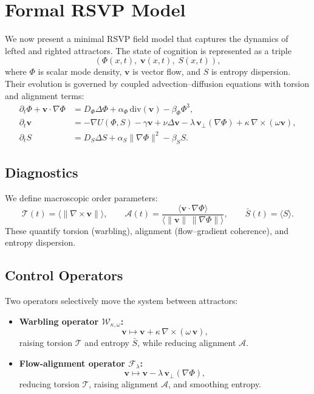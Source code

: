 \documentclass[a4paper,11pt]{article}
\begin{document}
\section{Formal RSVP Model}
\label{sec:formal-model}

We now present a minimal RSVP field model that captures the dynamics of lefted and righted attractors. The state of cognition is represented as a triple
\begin{equation}
(\Phi(x,t), \;\mathbf{v}(x,t), \;S(x,t)),
\end{equation}
where $\Phi$ is scalar mode density, $\mathbf{v}$ is vector flow, and $S$ is entropy dispersion. Their evolution is governed by coupled advection–diffusion equations with torsion and alignment terms:
\begin{align}
\partial_t \Phi + \mathbf{v}\cdot \nabla\Phi &= D_\Phi \Delta\Phi + \alpha_\Phi\,\mathrm{div}(\mathbf{v}) - \beta_\Phi \Phi^3, \label{eq:phi-main}\\[4pt]
\partial_t \mathbf{v} &= -\nabla U(\Phi,S) - \gamma \mathbf{v} + \nu \Delta \mathbf{v} 
- \lambda\,\mathbf{v}_\perp(\nabla\Phi) 
+ \kappa\, \nabla\times(\omega \mathbf{v}), \label{eq:v-main}\\[4pt]
\partial_t S &= D_S \Delta S + \alpha_S \|\nabla\Phi\|^2 - \beta_S S. \label{eq:S-main}
\end{align}

\subsection{Diagnostics}
We define macroscopic order parameters:
\begin{equation}
\mathcal{T}(t) = \big\langle \|\nabla\times \mathbf{v}\|\big\rangle, 
\qquad 
\mathcal{A}(t) = \frac{\langle \mathbf{v}\cdot \nabla \Phi\rangle}{\langle \|\mathbf{v}\|\,\|\nabla \Phi\|\rangle}, 
\qquad 
\bar{S}(t) = \langle S\rangle.
\end{equation}
These quantify torsion (warbling), alignment (flow–gradient coherence), and entropy dispersion.

\subsection{Control Operators}
Two operators selectively move the system between attractors:
\begin{itemize}
    \item \textbf{Warbling operator $\mathcal{W}_{\kappa,\omega}$:}
    \begin{equation}
    \mathbf{v} \mapsto \mathbf{v} + \kappa\,\nabla\times(\omega\,\mathbf{v}),
    \end{equation}
    raising torsion $\mathcal{T}$ and entropy $\bar{S}$, while reducing alignment $\mathcal{A}$.
    \item \textbf{Flow-alignment operator $\mathcal{F}_\lambda$:}
    \begin{equation}
    \mathbf{v} \mapsto \mathbf{v} - \lambda\,\mathbf{v}_\perp(\nabla\Phi),
    \end{equation}
    reducing torsion $\mathcal{T}$, raising alignment $\mathcal{A}$, and smoothing entropy.
\end{itemize}
\end{document}
